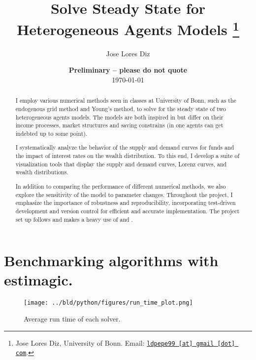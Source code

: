 \documentclass[a4paper,12pt]{article}
\begin{document}
\title{Solve Steady State for Heterogeneous Agents Models \thanks{Jose Lores Diz, University of Bonn. Email: \href{mailto:ldpepe99@gmail.com}{\nolinkurl{ldpepe99 [at] gmail [dot] com}}.}}

\author{Jose Lores Diz}

\date{
    {\bf Preliminary -- please do not quote}
    \\[1ex]
    \today
}

\maketitle


\begin{abstract}
I employ various numerical methods seen in classes at University of Bonn, such as the endogenous grid method \cite{carroll2006} and Young's \cite{young2015} method, to solve for the steady state of two heterogeneous agents models. The models are both inspired in \citet{aiyagari1994} but differ on their income processes, market structures and saving constrains (in one agents can get indebted up to some point).

I systematically analyze the behavior of the supply and demand curves for funds and the impact of interest rates on the wealth distribution. To this end, I develop a suite of visualization tools that display the supply and demand curves, Lorenz curves, and wealth distributions.

In addition to comparing the performance of different numerical methods, we also explore the sensitivity of the model to parameter changes. Throughout the project, I emphasize the importance of robustness and reproducibility, incorporating test-driven development and version control for efficient and accurate implementation. The project set up follows \cite{GaudeckerEconProjectTemplates} and makes a heavy use of \cite{numpy} and \cite{estimagic}.
\end{abstract}

\clearpage


\section{Benchmarking algorithms with estimagic.} %
\label{1}

\begin{figure}[htbp]
    \centering
        \texttt{[image: ../bld/python/figures/run\_time\_plot.png]}
        \caption{Average run time of each solver.}
        \label{fig:1}
\end{figure}
\end{document}
